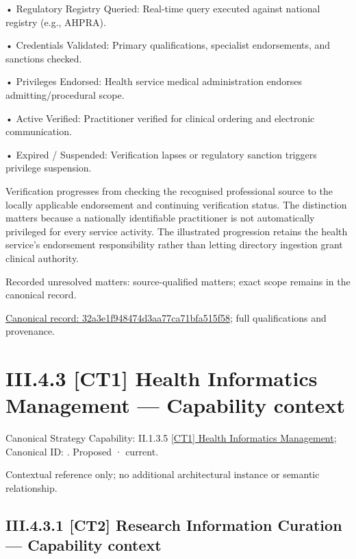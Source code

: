 •
Regulatory Registry Queried: Real-time query executed against national registry (e.g., AHPRA).



•
Credentials Validated: Primary qualifications, specialist endorsements, and sanctions checked.



•
Privileges Endorsed: Health service medical administration endorses admitting/procedural scope.



•
Active Verified: Practitioner verified for clinical ordering and electronic communication.



•
Expired / Suspended: Verification lapses or regulatory sanction triggers privilege suspension.



Verification progresses from checking the recognised professional source to the locally applicable endorsement and continuing verification status. The distinction matters because a nationally identifiable practitioner is not automatically privileged for every service activity. The illustrated progression retains the health service's endorsement responsibility rather than letting directory ingestion grant clinical authority.


{\small Recorded unresolved matters: source-qualified matters; exact scope remains in the canonical record.}\par
{\footnotesize \href{../../../../continuum/business/business-process/32a3e1f948474d3aa77ca71bfa515f58.md}{Canonical record: 32a3e1f948474d3aa77ca71bfa515f58}; full qualifications and provenance.}\par
\section*{III.4.3 [CT1] Health Informatics Management — Capability context}
\label{navigation:III.4.3}

{\small Canonical Strategy Capability: II.1.3.5 \hyperref[element:a790b5f2c5a1497fa6ec09d7824da32e]{[CT1] Health Informatics Management}; Canonical ID: \texttt{}. Proposed · current.}\par
Contextual reference only; no additional architectural instance or semantic relationship.\par
\subsection*{III.4.3.1 [CT2] Research Information Curation — Capability context}
\label{navigation:III.4.3.1}

